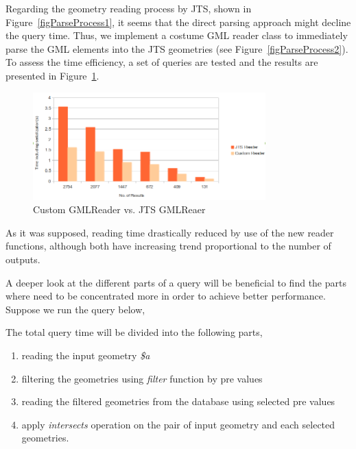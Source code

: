 \documentclass[a4paper,12pt]{article}
\begin{document}
Regarding the geometry reading process by JTS, shown in Figure~\ref{figParseProcess1}, it seems that the direct parsing approach might decline the query time. Thus, we implement a costume GML reader class to immediately parse the GML elements into the JTS geometries (see Figure~\ref{figParseProcess2}). To assess the time efficiency, a set of queries are tested and the results are presented in Figure~\ref{figGmlReader}. 

\begin{figure}
\centering
\includegraphics[width=0.8\textwidth]{GmlReader}
\caption{Custom GMLReader vs. JTS GMLReaer}
\label{figGmlReader}
\end{figure}

As it was supposed, reading time drastically reduced by use of the new reader functions, although both have increasing trend proportional to the number of outputs.%

A deeper look at the different parts of a query will be beneficial to find the parts where need to be concentrated more in order to achieve better performance. Suppose we run the query below,
\vspace{10px}
\vspace{10px}
The total query time will be divided into the following parts,

\begin{enumerate}
\item reading the input geometry \textit{\$a}
\item filtering the geometries using \textit{filter} function by pre values 
\item reading the filtered geometries from the database using selected pre values
\item apply \textit{intersects} operation on the pair of input geometry and each selected geometries.
\end{enumerate}
\end{document}
